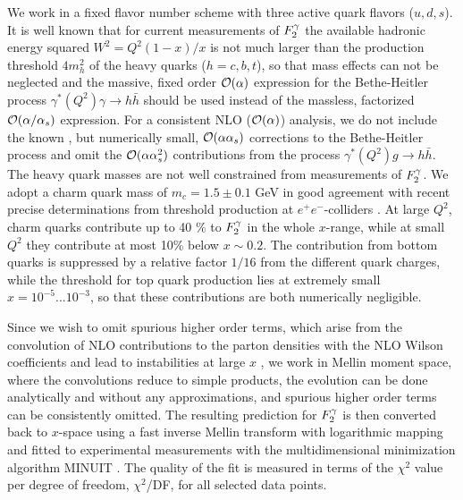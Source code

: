 \documentclass[aps,prl,twocolumn,groupedaddress]{revtex4}
\begin{document}
We work in a fixed flavor number scheme with three active quark flavors ($u,d,
s$). It is well known \cite{Gluck:1992ee} that for current measurements of
$\f2y$ the available hadronic energy squared $W^2=Q^2(1-x)/x$ is not much
larger than the production threshold $4m_h^2$ of the heavy quarks ($h=c,b,t$),
so that mass effects can not be neglected and the massive, fixed order
${\cal O}(\alpha)$ expression for the Bethe-Heitler process $\gamma^\ast(Q^2)\gamma
\to h\bar{h}$ \cite{Budnev:1974de} should be used instead of the massless,
factorized ${\cal O}(\alpha/\alpha_s)$ expression. For a consistent NLO
(${\cal O}(\alpha)$) analysis, we
do not include the known \cite{Laenen:1994ce}, but numerically small,
${\cal O}(\alpha\alpha_s)$ corrections to the Bethe-Heitler process and omit the
${\cal O}(\alpha\alpha_s^2)$ contributions from the process $\gamma^\ast(Q^2)g\to
h\bar{h}$. The heavy quark masses are not well constrained from measurements
of $\f2y$. We adopt a charm quark mass of $m_c=1.5\pm0.1$ GeV in good agreement
with recent precise determinations from threshold production at
$e^+e^-$-colliders \cite{Kuhn:2001dm}. At large $Q^2$, charm quarks contribute
up to 40 \% to $\f2y$ in the whole $x$-range, while at small $Q^2$ they
contribute at most 10\% below $x\sim 0.2$. The contribution from bottom quarks
is suppressed by a relative factor $1/16$ from the different quark charges,
while the threshold for top quark production lies at extremely small
$x=10^{-5}...10^{-3}$, so that these contributions are both numerically
negligible.

Since we wish to omit spurious higher order terms, which arise from the
convolution of NLO contributions to the parton densities with the NLO Wilson
coefficients and lead to instabilities at large $x$ \cite{Gluck:1992ee},
we work in
Mellin moment space, where the convolutions reduce to simple products, the
evolution can be done analytically and without any approximations, and
spurious higher order terms can be consistently omitted. The resulting
prediction for $\f2y$ is then converted back to $x$-space using a fast inverse
Mellin transform with logarithmic mapping and fitted to experimental
measurements with the multidimensional minimization algorithm MINUIT
\cite{James:1975dr}. The quality of the fit is measured in terms of the
$\chi^2$ value per degree of freedom, $\chi^2$/DF, for all selected data
points.
\end{document}
